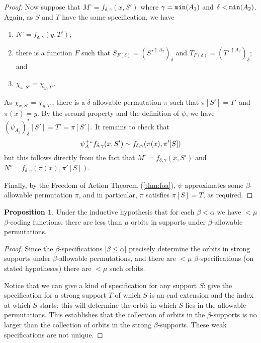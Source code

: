 \documentclass[112pt]{article}
\theoremstyle{definition}
\newtheorem{proposition}[theorem]{Proposition}
\theoremstyle{remark}
\begin{document}
\begin{proof}
Now suppose that $M^\circ = f_{\delta,\gamma}(x, S')$ where $\gamma = {\tt min}(A_1)$ and $\delta < {\tt min}(A_2)$.
Again, as $S$ and $T$ have the same specification, we have
\begin{enumerate}
  \item $N^\circ = f_{\delta,\gamma}(y, T')$;
  \item there is a function $F$ such that $S_{F(\delta)} = ({S'}^{\uparrow A_2})_\delta$ and $T_{F(\delta)} = ({T'}^{\uparrow A_2})_\delta$; and
  \item $\chi_{x,S'} = \chi_{y,T'}$.
\end{enumerate}
As $\chi_{x,S'} = \chi_{y,T'}$, there is a $\delta$-allowable permutation $\pi$ such that $\pi[S'] = T'$ and $\pi(x) = y$.
By the second property and the definition of $\psi$, we have $(\psi_{A_2})_\delta^*[S'] = T' = \pi[S']$.
It remains to check that
$$ \psi_A^+``f_{\delta,\gamma}(x,S') \sim f_{\delta,\gamma}(\pi(x),\pi'[S]) $$
but this follows directly from the fact that $M^\circ = f_{\delta,\gamma}(x,S')$ and $N^\circ = f_{\delta,\gamma}(\pi(x),\pi'[S])$.



Finally, by the Freedom of Action Theorem (\ref{thm:foa}), $\psi$ approximates some $\beta$-allowable permutation $\pi$, and in particular, $\pi$ satisfies $\pi[S] = T$, as required.


\end{proof}

\begin{proposition}\label{prop:count_support_orbits}
{Under the inductive hypothesis that for each $\beta<\alpha$ we have $<\mu$ $\beta$-coding functions, there are less than $\mu$ orbits in supports under $\beta$-allowable permutations.}
\end{proposition}
\begin{proof}
Since the $\beta$-specifications [$\beta \leq \alpha$] precisely determine the orbits in {strong} supports under $\beta$-allowable permutations, and there are $<\mu$ $\beta$-specifications
(on stated hypotheses) there are $<\mu$ such orbits.

Notice that we can give a kind of specification for any support $S$:  give the specification for a strong support $T$ of which $S$ is an end extension and the index at which $S$ starts:  this will determine the orbit in which $S$ lies in the allowable permutations.
This establishes that the collection of orbits in the $\beta$-supports is no larger than the collection of orbits in the strong $\beta$-supports.  These weak specifications are not unique. 
\end{proof}
\end{document}
